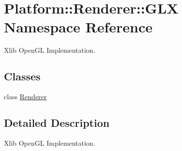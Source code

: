 \hypertarget{namespacePlatform_1_1Renderer_1_1GLX}{
\section{Platform::Renderer::GLX Namespace Reference}
\label{namespacePlatform_1_1Renderer_1_1GLX}
}


Xlib OpenGL Implementation.  
\subsection*{Classes}
\begin{DoxyCompactItemize}
\item 
class \hyperlink{classPlatform_1_1Renderer_1_1GLX_1_1Renderer}{Renderer}
\end{DoxyCompactItemize}


\subsection{Detailed Description}
Xlib OpenGL Implementation. 